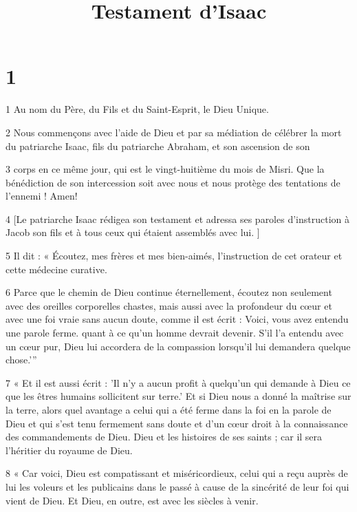 


\title{Testament d'Isaac}

\chapter{1}

\par 1 Au nom du Père, du Fils et du Saint-Esprit, le Dieu Unique.

\par 2 Nous commençons avec l'aide de Dieu et par sa médiation de célébrer la mort du patriarche Isaac, fils du patriarche Abraham, et son ascension de son

\par 3 corps en ce même jour, qui est le vingt-huitième du mois de Misri. Que la bénédiction de son intercession soit avec nous et nous protège des tentations de l’ennemi ! Amen!

\par 4 [Le patriarche Isaac rédigea son testament et adressa ses paroles d'instruction à Jacob son fils et à tous ceux qui étaient assemblés avec lui. ]

\par 5 Il dit : « Écoutez, mes frères et mes bien-aimés, l'instruction de cet orateur et cette médecine curative.

\par 6 Parce que le chemin de Dieu continue éternellement, écoutez non seulement avec des oreilles corporelles chastes, mais aussi avec la profondeur du cœur et avec une foi vraie sans aucun doute, comme il est écrit : Voici, vous avez entendu une parole ferme. quant à ce qu'un homme devrait devenir. S’il l’a entendu avec un cœur pur, Dieu lui accordera de la compassion lorsqu’il lui demandera quelque chose.’”

\par 7 « Et il est aussi écrit : 'Il n'y a aucun profit à quelqu'un qui demande à Dieu ce que les êtres humains sollicitent sur terre.' Et si Dieu nous a donné la maîtrise sur la terre, alors quel avantage a celui qui a été ferme dans la foi en la parole de Dieu et qui s'est tenu fermement sans doute et d'un cœur droit à la connaissance des commandements de Dieu. Dieu et les histoires de ses saints ; car il sera l’héritier du royaume de Dieu.

\par 8 « Car voici, Dieu est compatissant et miséricordieux, celui qui a reçu auprès de lui les voleurs et les publicains dans le passé à cause de la sincérité de leur foi qui vient de Dieu. Et Dieu, en outre, est avec les siècles à venir.

